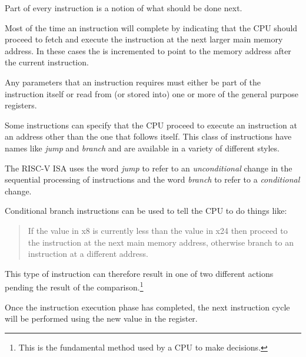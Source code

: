 Part of every instruction is a notion of what should be done next.

Most of the time an instruction will complete by indicating that
the CPU should proceed to fetch and execute the instruction at the next
larger main memory address.  In these cases the  is incremented
to point to the memory address after the current instruction.

Any parameters that an instruction requires must either be part of 
the instruction itself or read from (or stored into) one or more of the 
general purpose registers.

Some instructions can specify that the CPU proceed to execute an
instruction at an address other than the one that follows itself.
This class of instructions have names like {\em jump} and {\em branch}
and are available in a variety of different styles.

The RISC-V ISA uses the word {\em jump} to refer to an {\em unconditional}
change in the sequential processing of instructions and the word
{\em branch} to refer to a {\em conditional} change.

Conditional branch instructions can be used to tell the CPU to 
do things like:

\begin{quote}
If the value in x8 is currently less than the value in x24 then
proceed to the instruction at the next main memory address, otherwise
branch to an instruction at a different address.
\end{quote}

This type of instruction can therefore result in one of two different 
actions pending the result of the 
comparison.\footnote{This is the fundamental method used by a CPU 
to make decisions.}

Once the instruction execution phase has completed, the next instruction 
cycle will be performed using the new value in the  register.
